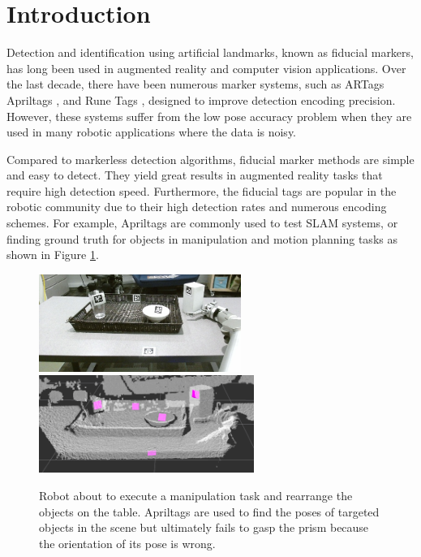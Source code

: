 \section{Introduction}
\label{sec:intro}

Detection and identification using artificial landmarks, known as fiducial markers, has long been used in augmented reality and computer vision applications. Over the last decade, there have been numerous marker systems, such as ARTags \citep{fiala2004artag} Apriltags \citep{olson2011apriltag}, and Rune Tags \citep{bergamasco2011rune}, designed to improve detection encoding precision. However, these systems suffer from the low pose accuracy problem when they are used in many robotic applications where the data is noisy.

Compared to markerless detection algorithms, fiducial marker methods are simple and easy to detect. They yield great results in augmented reality tasks that require high detection speed. Furthermore, the fiducial tags are popular in the robotic community due to their high detection rates and numerous encoding schemes. For example, Apriltags are commonly used to test SLAM systems, or finding ground truth for objects in manipulation and motion planning tasks as shown in Figure \ref{fig:table_clearing}. 

\begin{figure}
\includegraphics[width=\columnwidth, height=120px]{figs/table_clearing_rgb_small} \\
\includegraphics[width=\columnwidth, height=120px]{figs/table_clearing_depth}
\caption{Robot about to execute a manipulation task and rearrange the objects on the table. Apriltags are used to find the poses of targeted objects in the scene but ultimately fails to gasp the prism because the orientation of its pose is wrong.}
\label{fig:table_clearing}
\end{figure}

